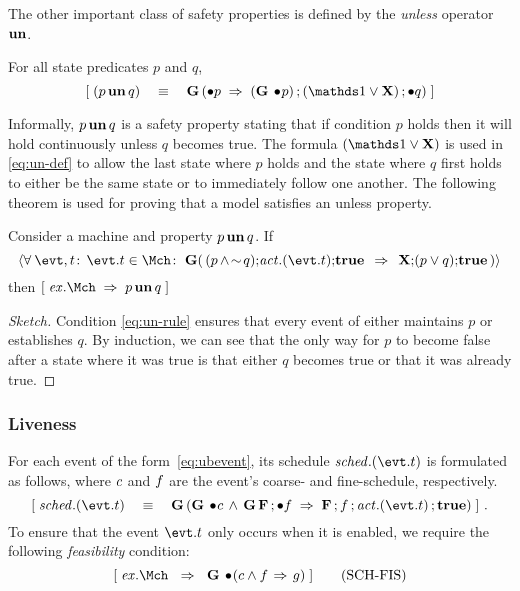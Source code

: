 The other important class of safety properties is defined by the
\emph{unless} operator $\un$.
\begin{Definition}[$\un$ operator]  For all state predicates $p$ and
  $q$,
  \begin{equation}
    \label{eq:un-def}
    \ew{(p \un q) \WIDE{\eqv} \G (\initially p \wide\limp (\G \initially \! p)\,;(\one \lor \X)\,;\initially q)}
  \end{equation}
\end{Definition}
Informally, $p \mathop{\textbf{un}} q$ is a safety property stating that if condition
$p$ holds then it will hold continuously unless $q$ becomes true.
The formula $(\one \lor \X)$ is used in \eqref{eq:un-def} to allow
the last state where $p$ holds and the state where $q$ first holds to 
either be the same state or to immediately follow one another.
The following theorem is used for proving that a \unitb model
satisfies an unless property.
\begin{Theorem}
  \label{thm:unless}
  Consider a machine \Mch and property $p \mathop{\textbf{un}} q$.  If
  \begin{equation}
    \label{eq:un-rule}
    \qforall{\evt,t}{\evt.t \in \Mch}{\, \G \!(\,(p \, \land \! \spneg q) ; \!
      \action.(\evt.t);\!\ctrue ~\,\limp\,~ \X ; \! (p \lor q);\! \ctrue \,)}
  \end{equation}
  then $\ew{\execution.\Mch \wide\limp p \un q}$
\end{Theorem}
\begin{proof}[Sketch]
  Condition \eqref{eq:un-rule} ensures that every event of \Mch either
  maintains $p$ or establishes $q$. By induction, we can see that the
  only way for $p$ to become false after a state where it was true is
  that either $q$ becomes true or that it was already true.
\end{proof}

\subsubsection{Liveness}
For each event of the form~\eqref{eq:ubevent}, its schedule
$\schedule.(\evt.t)$ is formulated as follows, where $c$ and
$f$ are the event's coarse- and fine-schedule, respectively.
\begin{equation}
  \label{eq:schedule}
  \ew{\schedule.(\evt.t) \WIDE{\eqv} \G (\G \initially \!\csched
      \,\land\, \G \F\,;\initially \fsched  \wide{\limp} 
      \F\,;\fsched\,;\action.(\evt.t)\,;\ctrue)}~.
\end{equation}
To ensure that the event $\evt.t$ only occurs when it is enabled, we
require the following \emph{feasibility} condition:
\begin{equation}
  \label{eq:fis}
  \ew{\execution.\Mch \Wide{\limp} \G \initially \!(c \land f \, \limp\, g)}
  \tag{SCH-FIS}
\end{equation}

